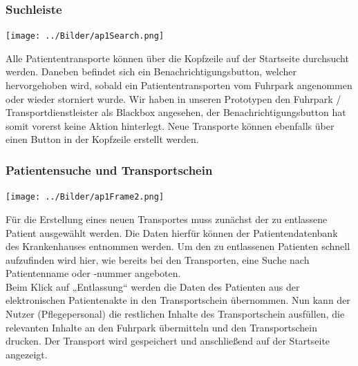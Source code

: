 \documentclass[a4paper, ngerman, 12pt]{scrartcl}
\begin{document}
\subsubsection{Suchleiste}
\begin{center}
\begin{minipage}{0.8\textwidth}
	\centering
	\texttt{[image: ../Bilder/ap1Search.png]}
	\label{img:ap1search}
\end{minipage}
\end{center}
Alle Patiententransporte können über die Kopfzeile auf der Startseite durchsucht werden. Daneben befindet sich ein Benachrichtigungsbutton, welcher hervorgehoben wird, sobald ein Patiententransporten vom Fuhrpark angenommen oder wieder storniert wurde. Wir haben in unseren Prototypen den Fuhrpark / Transportdienstleister als Blackbox angesehen, der Benachrichtigungsbutton hat somit vorerst keine Aktion hinterlegt. Neue Transporte können ebenfalls über einen Button in der Kopfzeile erstellt werden.
\subsubsection{Patientensuche und Transportschein}
\begin{center}
\begin{minipage}{0.8\textwidth}
	\centering
	\texttt{[image: ../Bilder/ap1Frame2.png]}
	\label{img:ap1frame2}
\end{minipage}
\end{center}
Für die Erstellung eines neuen Transportes muss zunächst der zu entlassene Patient ausgewählt werden. Die Daten hierfür können der Patientendatenbank des Krankenhauses entnommen werden. Um den zu entlassenen Patienten schnell aufzufinden wird hier, wie bereits bei den Transporten, eine Suche nach Patientenname oder -nummer angeboten.\\

Beim Klick auf „Entlassung“ werden die Daten des Patienten aus der elektronischen Patientenakte in den Transportschein übernommen. Nun kann der Nutzer (Pflegepersonal) die restlichen Inhalte des Transportschein ausfüllen, die relevanten Inhalte an den Fuhrpark übermitteln und den Transportschein drucken. Der Transport wird gespeichert und anschließend auf der Startseite angezeigt.
\end{document}
